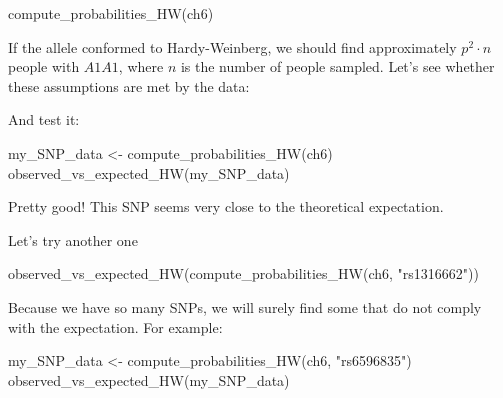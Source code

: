 \documentclass[
  letterpaper,
  DIV=11,
  numbers=noendperiod]{scrreprt}
\newenvironment{Shaded}{\begin{snugshade}}{\end{snugshade}}
\newcommand{\NormalTok}[1]{\textcolor[rgb]{0.00,0.23,0.31}{#1}}
\begin{document}
\begin{Shaded}
\begin{Highlighting}[]
\NormalTok{compute\_probabilities\_HW(ch6)}
\end{Highlighting}
\end{Shaded}

If the allele conformed to Hardy-Weinberg, we should find approximately
\(p^2 \cdot n\) people with \(A1A1\), where \(n\) is the number of
people sampled. Let's see whether these assumptions are met by the data:

\begin{Shaded}
\end{Shaded}

And test it:

\begin{Shaded}
\begin{Highlighting}[]
\NormalTok{my\_SNP\_data \textless{}{-} compute\_probabilities\_HW(ch6)}
\NormalTok{observed\_vs\_expected\_HW(my\_SNP\_data)}
\end{Highlighting}
\end{Shaded}

Pretty good! This SNP seems very close to the theoretical expectation.

Let's try another one

\begin{Shaded}
\begin{Highlighting}[]
\NormalTok{observed\_vs\_expected\_HW(compute\_probabilities\_HW(ch6, "rs1316662"))}
\end{Highlighting}
\end{Shaded}

Because we have so many SNPs, we will surely find some that do not
comply with the expectation. For example:

\begin{Shaded}
\begin{Highlighting}[]
\NormalTok{my\_SNP\_data \textless{}{-} compute\_probabilities\_HW(ch6, "rs6596835")}
\NormalTok{observed\_vs\_expected\_HW(my\_SNP\_data)}
\end{Highlighting}
\end{Shaded}
\end{document}
